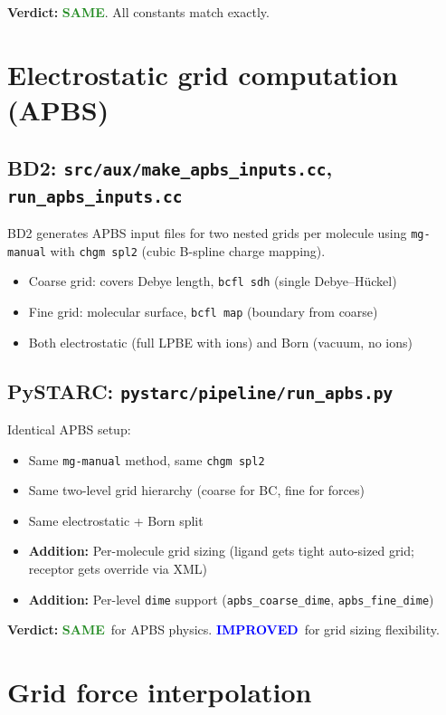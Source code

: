 \documentclass[11pt]{article}
\newcommand{\same}{\textcolor{ForestGreen}{\textbf{SAME}}}
\newcommand{\improved}{\textcolor{Blue}{\textbf{IMPROVED}}}
\begin{document}
\textbf{Verdict:} \same. All constants match exactly.


\section{Electrostatic grid computation (APBS)}

\subsection{BD2: \texttt{src/aux/make\_apbs\_inputs.cc}, \texttt{run\_apbs\_inputs.cc}}
BD2 generates APBS input files for two nested grids per molecule using
\texttt{mg-manual} with \texttt{chgm spl2} (cubic B-spline charge mapping).
\begin{itemize}
\item Coarse grid: covers Debye length, \texttt{bcfl sdh} (single Debye--H\"uckel)
\item Fine grid: molecular surface, \texttt{bcfl map} (boundary from coarse)
\item Both electrostatic (full LPBE with ions) and Born (vacuum, no ions)
\end{itemize}

\subsection{PySTARC: \texttt{pystarc/pipeline/run\_apbs.py}}
Identical APBS setup:
\begin{itemize}
\item Same \texttt{mg-manual} method, same \texttt{chgm spl2}
\item Same two-level grid hierarchy (coarse for BC, fine for forces)
\item Same electrostatic + Born split
\item \textbf{Addition:} Per-molecule grid sizing (ligand gets tight auto-sized grid; receptor gets override via XML)
\item \textbf{Addition:} Per-level \texttt{dime} support (\texttt{apbs\_coarse\_dime}, \texttt{apbs\_fine\_dime})
\end{itemize}

\textbf{Verdict:} \same\ for APBS physics. \improved\ for grid sizing flexibility.


\section{Grid force interpolation}
\end{document}
